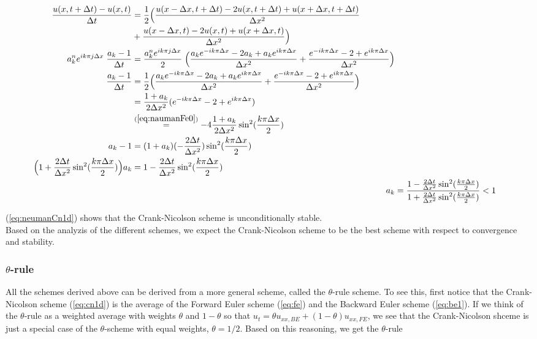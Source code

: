 \documentclass{article}
\begin{document}
\begin{subequations}
	\begin{align}
		\begin{split}
			\frac{u(x,t+\Delta t) - u(x,t)}{\Delta t} 
			&= \frac{1}{2} \Big(\frac{u(x-\Delta x,t+ \Delta t)
			- 2u(x,t+\Delta t) +u(x+\Delta x,t+\Delta t)}{\Delta x^2} \\
			&+ \frac{u(x-\Delta x,t) - 2u(x,t) +u(x+ \Delta x,t)}{\Delta x^2} \Big) \\
			a_k^n e^{i k \pi j \Delta x}\; \frac{ a_k  - 1}{\Delta t} &= \frac{a_k^n e^{i k \pi j \Delta x}}{2}\; \Big(\frac{a_k e^{-i k \pi \Delta x} - 2a_k + a_k e^{i k \pi \Delta x}}{\Delta x^2} + \frac{e^{-i k \pi \Delta x} - 2 +  e^{i k \pi \Delta x}}{\Delta x^2} \Big)\\
			\frac{ a_k  - 1}{\Delta t}&=\frac{1}{2}\Big(\frac{a_k e^{-i k \pi \Delta x} - 2a_k + a_k e^{i k \pi \Delta x}}{\Delta x^2} + \frac{e^{-i k \pi \Delta x} - 2 +  e^{i k \pi \Delta x}}{\Delta x^2} \Big)\\
			&= \frac{1+a_k}{2\Delta x^2} (e^{-i k \pi \Delta x} - 2 + e^{i k \pi \Delta x})\\
			&\stackrel{(\ref{eq:naumanFe0})}{=} -4\frac{1+a_k}{2\Delta x^2} \sin^2(\frac{k\pi \Delta x}{2})\\
			a_k -1 &= (1 + a_k) (-\frac{2 \Delta t}{\Delta x^2})\sin^2(\frac{k\pi \Delta x}{2})\\
			\Big(1 +\frac{2 \Delta t}{\Delta x^2}\sin^2(\frac{k\pi \Delta x}{2})\Big)a_k &= 1 - \frac{2 \Delta t}{\Delta x^2}\sin^2(\frac{k\pi \Delta x}{2})
			\end{split}\\
			a_k &= \frac{1 - \frac{2 \Delta t}{\Delta x^2}\sin^2(\frac{k\pi \Delta x}{2})}{1 +\frac{2 \Delta t}{\Delta x^2}\sin^2(\frac{k\pi \Delta x}{2})} < 1\label{eq:neumanCn1d}
	\end{align}
\end{subequations}

(\ref{eq:neumanCn1d}) shows that the Crank-Nicolson scheme is unconditionally stable.\\

Based on the analyzis of the different schemes, we expect the Crank-Nicolson scheme to be the best scheme with respect to convergence and stability. 

\subsubsection{$\theta$-rule}
All the schemes derived above can be derived from a more general scheme, called the $\theta$-rule scheme. To see this, first notice that the Crank-Nicolson scheme (\ref{eq:cn1d}) is the average of the Forward Euler scheme (\ref{eq:fe}) and the Backward Euler scheme (\ref{eq:be1}). If we think of the $\theta$-rule as a weighted average with weights $\theta$ and $1-\theta$ so that $u_{t} = \theta u_{xx,BE} + (1- \theta) u_{xx,FE}$, we see that the Crank-Nicolson shceme is just a special case of the $\theta$-scheme with equal weights, $\theta = 1/2$. Based on this reasoning, we get the $\theta$-rule
\end{document}
